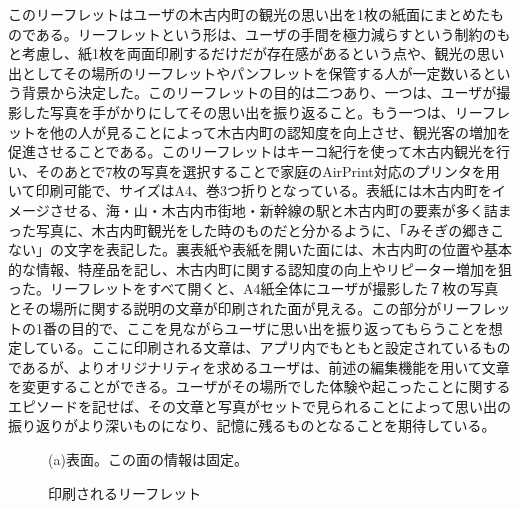 このリーフレットはユーザの木古内町の観光の思い出を1枚の紙面にまとめたものである。リーフレットという形は、ユーザの手間を極力減らすという制約のもと考慮し、紙1枚を両面印刷するだけだが存在感があるという点や、観光の思い出としてその場所のリーフレットやパンフレットを保管する人が一定数いるという背景から決定した。このリーフレットの目的は二つあり、一つは、ユーザが撮影した写真を手がかりにしてその思い出を振り返ること。もう一つは、リーフレットを他の人が見ることによって木古内町の認知度を向上させ、観光客の増加を促進させることである。このリーフレットはキーコ紀行を使って木古内観光を行い、そのあとで7枚の写真を選択することで家庭のAirPrint対応のプリンタを用いて印刷可能で、サイズはA4、巻3つ折りとなっている。表紙には木古内町をイメージさせる、海・山・木古内市街地・新幹線の駅と木古内町の要素が多く詰まった写真に、木古内町観光をした時のものだと分かるように、「みそぎの郷きこない」の文字を表記した。裏表紙や表紙を開いた面には、木古内町の位置や基本的な情報、特産品を記し、木古内町に関する認知度の向上やリピーター増加を狙った。リーフレットをすべて開くと、A4紙全体にユーザが撮影した７枚の写真とその場所に関する説明の文章が印刷された面が見える。この部分がリーフレットの1番の目的で、ここを見ながらユーザに思い出を振り返ってもらうことを想定している。ここに印刷される文章は、アプリ内でもともと設定されているものであるが、よりオリジナリティを求めるユーザは、前述の編集機能を用いて文章を変更することができる。ユーザがその場所でした体験や起こったことに関するエピソードを記せば、その文章と写真がセットで見られることによって思い出の振り返りがより深いものになり、記憶に残るものとなることを期待している。

\begin{figure}[p]
\begin{center}
\hspace{1cm} (a)表面。この面の情報は固定。
\caption{印刷されるリーフレット}
\end{center}
\end{figure}

